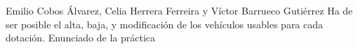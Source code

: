 {Emilio Cobos Álvarez, Celia Herrera Ferreira y Víctor Barrueco Gutiérrez}
{Ha de ser posible el alta, baja, y modificación de los vehículos usables para cada dotación.}
{}
{Enunciado de la práctica}

